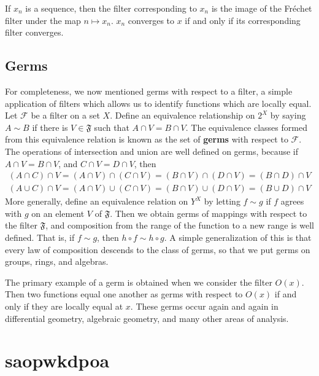 \begin{example}
\begin{example}
    If $x_n$ is a sequence, then the filter corresponding to $x_n$ is the image of the Fr\'{e}chet filter under the map $n \mapsto x_n$. $x_n$ converges to $x$ if and only if its corresponding filter converges.
\end{example}

\subsection{Germs}

For completeness, we now mentioned germs with respect to a filter, a simple application of filters which allows us to identify functions which are locally equal. Let $\mathcal{F}$ be a filter on a set $X$. Define an equivalence relationship on $2^X$ by saying $A \sim B$ if there is $V \in \mathfrak{F}$ such that $A \cap V = B \cap V$. The equivalence classes formed from this equivalence relation is known as the set of {\bf germs} with respect to $\mathcal{F}$. The operations of intersection and union are well defined on germs, because if $A \cap V = B \cap V$, and $C \cap V = D \cap V$, then
%
\begin{align*}
    (A \cap C) \cap V = (A \cap V) \cap (C \cap V) = (B \cap V) \cap (D \cap V) = (B \cap D) \cap V\\
    (A \cup C) \cap V = (A \cap V) \cup (C \cap V) = (B \cap V) \cup (D \cap V) = (B \cup D) \cap V
\end{align*}
%
More generally, define an equivalence relation on $Y^X$ by letting $f \sim g$ if $f$ agrees with $g$ on an element $V$ of $\mathfrak{F}$. Then we obtain germs of mappings with respect to the filter $\mathfrak{F}$, and composition from the range of the function to a new range is well defined. That is, if $f \sim g$, then $h \circ f \sim h \circ g$. A simple generalization of this is that every law of composition descends to the class of germs, so that we put germs on groups, rings, and algebras.

\begin{example}
    The primary example of a germ is obtained when we consider the filter $O(x)$. Then two functions equal one another as germs with respect to $O(x)$ if and only if they are locally equal at $x$. These germs occur again and again in differential geometry, algebraic geometry, and many other areas of analysis.
\end{example}

\section{saopwkdpoa}


\end{example}
